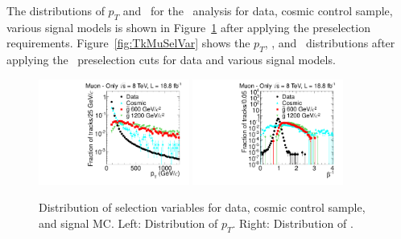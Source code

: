 The distributions of $p_T$ and \invbeta\ for the \muononly\ analysis for data, cosmic control sample, various signal models is 
shown in Figure~\ref{fig:MuOnlySelVar} after applying the preselection requirements. Figure~\ref{fig:TkMuSelVar} shows the $p_T$, \invbeta, and \dedx\
distributions after applying the \tktof\ preselection cuts for data and various signal models.

\begin{figure}
\centering
  \includegraphics[clip=true, trim=0.0cm 0cm 2.8cm 0cm, width=0.44\textwidth]{figures/muonly/Selection_Comp_8TeV_Cosmic_Pt_BS}
  \includegraphics[clip=true, trim=0.0cm 0cm 2.8cm 0cm, width=0.44\textwidth]{figures/muonly/Selection_Comp_8TeV_Cosmic_TOF_BS} \\
  \caption{Distribution of selection variables for data, cosmic control sample, and signal MC.
Left: Distribution of $p_T$. Right: Distribution of \invbeta.
    \label{fig:MuOnlySelVar}}
\end{figure}

